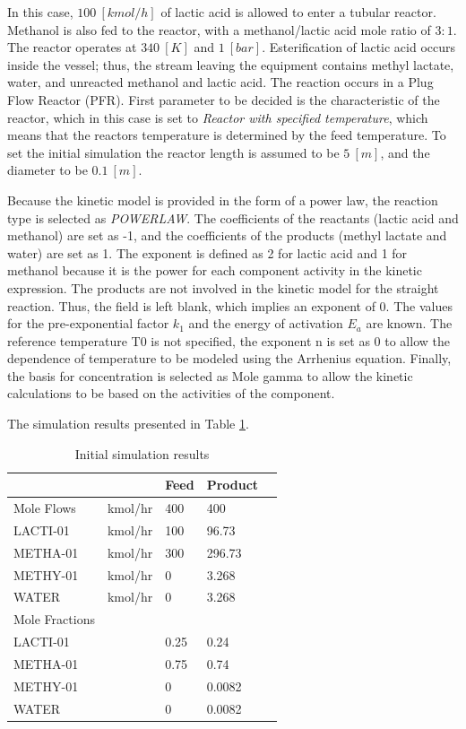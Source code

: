 In this case, $100~[kmol/h]$ of lactic acid is allowed to enter a tubular reactor. Methanol is also fed to the reactor, with a methanol/lactic acid mole ratio of $3:1$. The reactor operates at $340~[K]$ and $1~[bar]$. Esterification of lactic acid occurs inside the vessel; thus, the stream leaving the equipment contains methyl lactate, water, and unreacted methanol and lactic acid. The reaction occurs in a Plug Flow Reactor (PFR). First parameter to be decided is the characteristic of the reactor, which in this case is set to \textit{Reactor with specified temperature}, which means that the reactors temperature is determined by the feed temperature. To set the initial simulation the reactor length is assumed to be $5~[m]$, and the diameter to be $0.1~[m]$. 

Because the kinetic model is provided in the form of a power law, the reaction type is selected as \textit{POWERLAW}. The coefficients of the reactants (lactic acid and methanol) are set as -1, and the coefficients of the products (methyl lactate and water) are set as 1. The exponent is defined as 2 for lactic acid and 1 for methanol because it is the power for each component activity in the kinetic expression. The products are not involved in the kinetic model for the straight reaction. Thus, the field is left blank, which implies an exponent of 0. The values for the pre-exponential factor $k_1$ and the energy of activation $E_a$ are known. The reference temperature T0 is not specified, the exponent n is set as 0 to allow the dependence of temperature to be modeled using the Arrhenius equation. Finally, the basis for concentration is selected as Mole gamma to allow the kinetic calculations to be based on the activities of the component.

The simulation results presented in Table \ref{tab:Ester_Initial}.

\begin{table}[h!]
	\centering
	\begin{tabular}{ll|lll}
		&         	   & Feed 	 & Product 	&  \\ \hline
		Mole Flows     & kmol/hr & 400  	& 400     &  \\
		LACTI-01       & kmol/hr & 100  	& 96.73   &  \\
		METHA-01       & kmol/hr & 300  	& 296.73  &  \\
		METHY-01       & kmol/hr & 0    	& 3.268   &  \\
		WATER          & kmol/hr & 0    	& 3.268   &  \\ \hline
		Mole Fractions &         &      	&         &  \\
		LACTI-01       &         & 0.25 	& 0.24    &  \\
		METHA-01       &         & 0.75 	& 0.74    &  \\
		METHY-01       &         & 0    	& 0.0082  &  \\
		WATER          &         & 0    	& 0.0082  & 
	\end{tabular}
	\caption{Initial simulation results}
	\label{tab:Ester_Initial}
\end{table}

